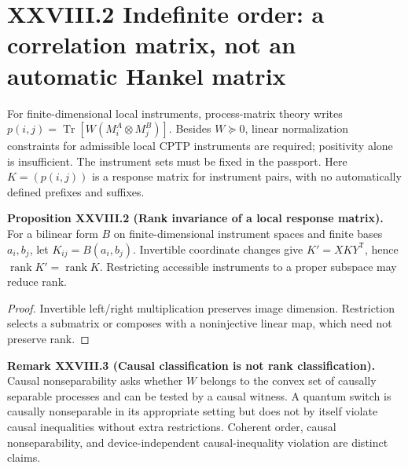 \documentclass[11pt,a4paper,oneside]{book}
\DeclareMathOperator{\rank}{rank}\DeclareMathOperator{\Tr}{Tr}
\newcommand{\statement}[3]{\par\medskip\noindent\textbf{#1 #2 (#3).}\ }
\begin{document}
\section*{XXVIII.2 Indefinite order: a correlation matrix, not an automatic Hankel matrix}
For finite-dimensional local instruments, process-matrix theory writes $p(i,j)=\Tr[W(M_i^A\otimes M_j^B)]$. Besides $W\succeq0$, linear normalization constraints for admissible local CPTP instruments are required; positivity alone is insufficient. The instrument sets must be fixed in the passport. Here $K=(p(i,j))$ is a response matrix for instrument pairs, with no automatically defined prefixes and suffixes.
\statement{Proposition}{XXVIII.2}{Rank invariance of a local response matrix} For a bilinear form $B$ on finite-dimensional instrument spaces and finite bases $a_i,b_j$, let $K_{ij}=B(a_i,b_j)$. Invertible coordinate changes give $K'=XKY^{\mathsf T}$, hence $\rank K'=\rank K$. Restricting accessible instruments to a proper subspace may reduce rank.
\begin{proof}Invertible left/right multiplication preserves image dimension. Restriction selects a submatrix or composes with a noninjective linear map, which need not preserve rank.\end{proof}
\statement{Remark}{XXVIII.3}{Causal classification is not rank classification} Causal nonseparability asks whether $W$ belongs to the convex set of causally separable processes and can be tested by a causal witness. A quantum switch is causally nonseparable in its appropriate setting but does not by itself violate causal inequalities without extra restrictions. Coherent order, causal nonseparability, and device-independent causal-inequality violation are distinct claims.
\end{document}
